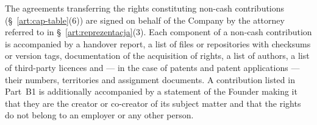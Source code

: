 \documentclass[12pt,a4paper]{report}
\begin{document}
The agreements transferring the rights constituting non-cash contributions (\S~\ref{art:cap-table}(6)) are signed on behalf of the Company by the attorney referred to in \S~\ref{art:reprezentacja}(3). Each component of a non-cash contribution is accompanied by a handover report, a list of files or repositories with checksums or version tags, documentation of the acquisition of rights, a list of authors, a list of third-party licences and --- in the case of patents and patent applications --- their numbers, territories and assignment documents. A contribution listed in Part~B1 is additionally accompanied by a statement of the Founder making it that they are the creator or co-creator of its subject matter and that the rights do not belong to an employer or any other person.
\end{document}
